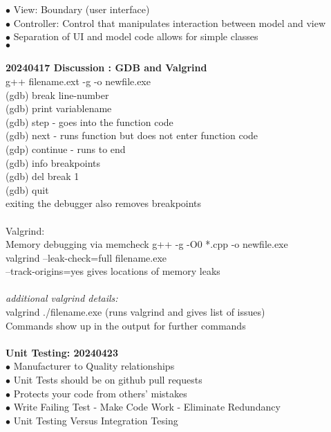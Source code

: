 \documentclass[11pt]{article}
\begin{document}
    \indent\indent $\bullet$ View: Boundary (user interface)\\
    \indent\indent $\bullet$ Controller: Control that manipulates interaction between model and view\\
    \indent\indent $\bullet$ Separation of UI and model code allows for simple classes \\
    \indent $\bullet$ 
    \\ \\
    \textbf{20240417 Discussion : GDB and Valgrind}\\
    g++ filename.ext -g -o newfile.exe\\
    (gdb) break line-number\\
    (gdb) print variablename\\
    (gdb) step - goes into the function code\\
    (gdb) next - runs function but does not enter function code\\
    (gdp) continue - runs to end\\
    (gdb) info breakpoints\\
    (gdb) del break 1\\
    (gdb) quit\\
    exiting the debugger also removes breakpoints\\
\\
Valgrind:\\
Memory debugging via memcheck
g++ -g -O0 *.cpp -o newfile.exe\\
valgrind --leak-check=full filename.exe\\
--track-origins=yes gives locations of memory leaks\\
\\
\textit{additional valgrind details:}\\
valgrind ./filename.exe (runs valgrind and gives list of issues)\\
Commands show up in the output for further commands\\
\\
\textbf{Unit Testing: 20240423}\\
\indent $\bullet$ Manufacturer to Quality relationships \\
\indent $\bullet$ Unit Tests should be on github pull requests \\
\indent $\bullet$ Protects your code from others' mistakes \\
\indent $\bullet$ Write Failing Test - Make Code Work - Eliminate Redundancy \\
\indent $\bullet$ Unit Testing Versus Integration Tesing \\
\end{document}
